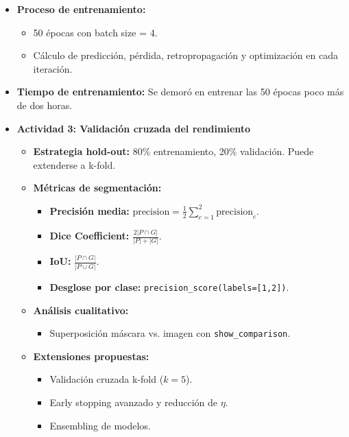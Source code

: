 \begin{enumerate}
\begin{itemize}
\begin{itemize}
      \end{itemize}
  
      \item \textbf{Proceso de entrenamiento:}
      \begin{itemize}
        \item 50 épocas con batch size = 4.
        \item Cálculo de predicción, pérdida, retropropagación y optimización en cada iteración.
      \end{itemize}
    
      \item \textbf{Tiempo de entrenamiento:}
      Se demoró en entrenar las 50 épocas poco más de dos horas.
    

  \vspace{0.5cm}

  \item\textbf{Actividad 3: Validación cruzada del rendimiento}
  \begin{itemize}
    \item \textbf{Estrategia hold-out:}
      80\% entrenamiento, 20\% validación. Puede extenderse a k-fold.
  
    \item \textbf{Métricas de segmentación:}
      \begin{itemize}
        \item \textbf{Precisión media:} \(\text{precision} = \frac{1}{2}\sum_{c=1}^2 \text{precision}_c\).
        \item \textbf{Dice Coefficient:} \(\frac{2|P\cap G|}{|P|+|G|}\).
        \item \textbf{IoU:} \(\frac{|P\cap G|}{|P\cup G|}\).
        \item \textbf{Desglose por clase:} \texttt{precision\_score(labels=[1,2])}.
      \end{itemize}
  
    \item \textbf{Análisis cualitativo:}
      \begin{itemize}
        \item Superposición máscara vs. imagen con \texttt{show\_comparison}.
   \end{itemize}
  
    \item \textbf{Extensiones propuestas:}
      \begin{itemize}
        \item Validación cruzada k-fold (\(k=5\)).
        \item Early stopping avanzado y reducción de \(\eta\).
        \item Ensembling de modelos.
      \end{itemize}
  \end{itemize}
  


\end{itemize}
\end{enumerate}
